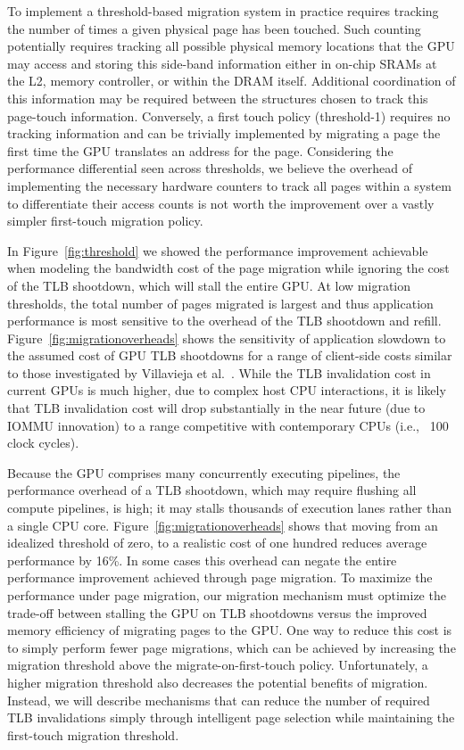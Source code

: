 To implement a threshold-based migration system in practice requires tracking the number of times a given physical page
has been touched.  Such counting potentially requires tracking all possible physical memory locations that the GPU may access
and storing this side-band information either in on-chip SRAMs at the L2, memory controller, or within the DRAM itself.  Additional
coordination of this information may be required between the structures chosen to track this page-touch information. Conversely,
a first touch policy (threshold-1) requires no tracking information and can be trivially implemented by migrating a page the first time
the GPU translates an address for the page.  Considering the performance differential
seen across thresholds, we believe the overhead of implementing the necessary hardware counters to track all pages within a system 
to differentiate their access counts is not worth the improvement over a vastly simpler first-touch migration policy.

In Figure~\ref{fig:threshold} we showed the performance improvement achievable 
when modeling the bandwidth cost of the page migration while ignoring the 
cost of the TLB shootdown, which will stall the entire GPU.  At low migration 
thresholds, the total number of pages migrated is largest and thus application 
performance is most sensitive to the overhead of the TLB shootdown and refill. 
Figure~\ref{fig:migrationoverheads} shows the sensitivity of application 
slowdown to the assumed cost of GPU TLB shootdowns for a range of client-side 
costs similar 
to those investigated by Villavieja et al.~\cite{Villavieja2011}. 
While the TLB invalidation cost in current GPUs is much higher, due to complex 
host CPU interactions, it is likely that TLB invalidation cost will drop 
substantially in the near future (due to IOMMU innovation) to a range 
competitive with contemporary CPUs (i.e., ~100 clock cycles).

Because the GPU comprises many concurrently executing pipelines, the performance 
overhead of a TLB shootdown, which may require flushing all compute pipelines, is 
high; it may stalls thousands of execution lanes rather than a single CPU core.  
Figure~\ref{fig:migrationoverheads} shows that moving from an idealized threshold of 
zero, to a realistic cost of one hundred reduces average performance by 16\%.  In 
some cases this overhead can negate the entire performance improvement achieved 
through page migration. To maximize the performance under page migration, our 
migration mechanism must optimize the trade-off between stalling the GPU on TLB 
shootdowns versus the improved memory efficiency of migrating pages to the GPU\@.  
One way to reduce this cost is to simply perform fewer page migrations, which can 
be achieved by increasing the migration threshold above the 
migrate-on-first-touch policy.  Unfortunately, a higher migration threshold also 
decreases the potential benefits of migration.  Instead, we will describe 
mechanisms that can reduce the number of required TLB invalidations simply 
through intelligent page selection while maintaining the first-touch 
migration threshold.

